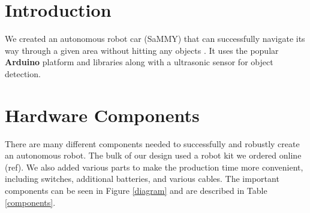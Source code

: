 \documentclass[11pt]{article}
\begin{document}

\section{Introduction} 
We created an autonomous robot car (SaMMY) that can successfully navigate its way through a given area without hitting any objects .  It uses the popular \textbf{Arduino} platform and libraries along with a ultrasonic sensor for object detection.  










\section{Hardware Components}
There are many different components needed to successfully and robustly create an autonomous robot.  The bulk of our design used a robot kit we ordered online (ref).  We also added various parts to make the production time more convenient, including switches, additional batteries, and various cables.  The important components can be seen in Figure \ref{diagram} and are described in Table \ref{components}.
\end{document}
